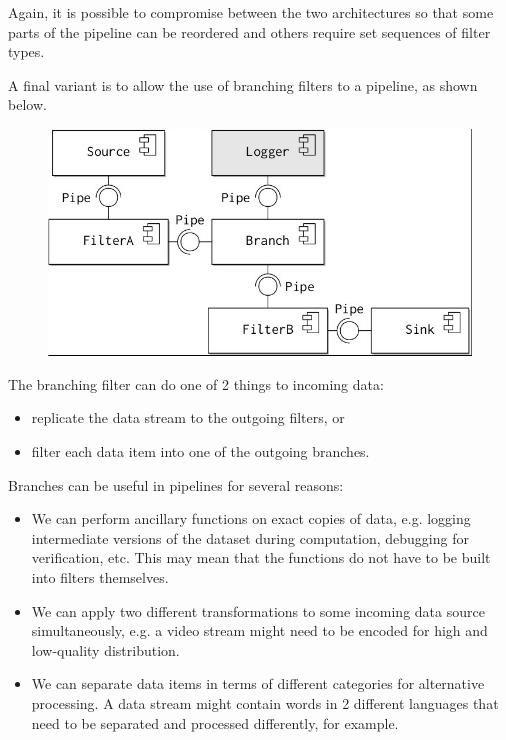 \documentclass[a4paper, openany]{memoir}
\begin{document}
Again, it is possible to compromise between the two architectures so that some parts of the pipeline can be reordered and others require set sequences of filter types.

A final variant is to allow the use of branching filters to a pipeline, as shown below.
\begin{figure}[H]
    \centering
    \includegraphics[scale=0.45]{src/14.19 branching filters.png}
\end{figure}
\noindent The branching filter can do one of 2 things to incoming data:
\begin{itemize}
    \item replicate the data stream to the outgoing filters, or
    \item filter each data item into one of the outgoing branches.
\end{itemize}

Branches can be useful in pipelines for several reasons:
\begin{itemize}
    \item We can perform ancillary functions on exact copies of data, e.g. logging intermediate versions of the dataset during computation,  debugging for verification, etc. This may mean that the functions do not have to be built into filters themselves.
    \item We can apply two different transformations to some incoming data source simultaneously, e.g. a video stream might need to be encoded for high and low-quality distribution.
    \item We can separate data items in terms of different categories for alternative processing. A data stream might contain words in 2 different languages that need to be separated and processed differently, for example.
\end{itemize}
\end{document}
